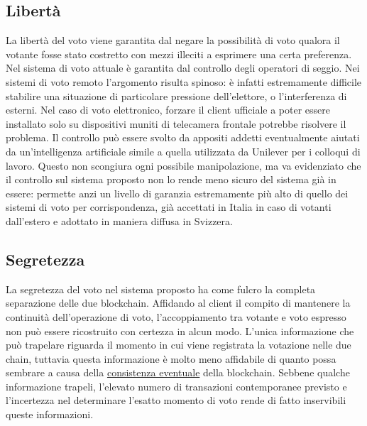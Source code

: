 	\subsection{Libertà}\label{subsec:liberta_voto}
		La libertà del voto viene garantita dal negare la possibilità di voto qualora il votante fosse stato costretto con mezzi illeciti a esprimere una certa preferenza. Nel sistema di voto attuale è garantita dal controllo degli operatori di seggio. Nei sistemi di voto remoto l'argomento risulta spinoso: è infatti estremamente difficile stabilire una situazione di particolare pressione dell'elettore, o l'interferenza di esterni. Nel caso di voto elettronico, forzare il client ufficiale a poter essere installato solo su dispositivi muniti di telecamera frontale potrebbe risolvere il problema. Il controllo può essere svolto da appositi addetti eventualmente aiutati da un'intelligenza artificiale simile a quella utilizzata da Unilever \cite{ai_unilever} per i colloqui di lavoro. Questo non scongiura ogni possibile manipolazione, ma va evidenziato che il controllo sul sistema proposto non lo rende meno sicuro del sistema già in essere: permette anzi un livello di garanzia estremamente più alto di quello dei sistemi di voto per corrispondenza, già accettati in Italia in caso di votanti dall'estero e adottato in maniera diffusa in Svizzera.

	\subsection{Segretezza}
		La segretezza del voto nel sistema proposto ha come fulcro la completa separazione delle due blockchain. Affidando al client il compito di mantenere la continuità dell'operazione di voto, l'accoppiamento tra votante e voto espresso non può essere ricostruito con certezza in alcun modo. L'unica informazione che può trapelare riguarda il momento in cui viene registrata la votazione nelle due chain, tuttavia questa informazione è molto meno affidabile di quanto possa sembrare a causa della \href{sec:teorema_CAP}{consistenza eventuale} della blockchain. Sebbene qualche informazione trapeli, l'elevato numero di transazioni contemporanee previsto e l'incertezza nel determinare l'esatto momento di voto rende di fatto inservibili queste informazioni.


